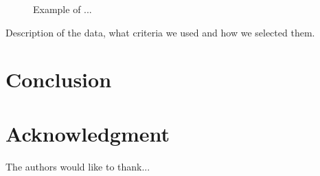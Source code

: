\documentclass[conference]{IEEEtran}
\begin{document}
\begin{figure}[h]
\caption{Example of ...}

\end{figure}


Description of the data, what criteria we used and how we selected them.






\section{Conclusion}




\section*{Acknowledgment}


The authors would like to thank...


\ifCLASSOPTIONcaptionsoff
  \newpage
\fi





\end{document}
